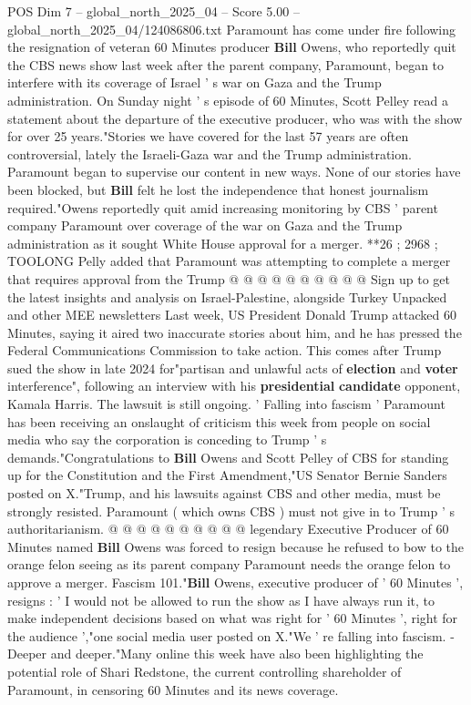 \begin{textsample}{POS Dim 7 – global\_north\_2025\_04 – Score 5.00 – global\_north\_2025\_04/124086806.txt}  \label{ex:f7_pos_365}
Paramount has come under fire following the resignation of veteran 60 Minutes producer \textbf{Bill} Owens, who reportedly quit the CBS news show last week after the parent company, Paramount, began to interfere with its coverage of Israel ' s war on Gaza and the Trump administration.
On Sunday night ' s episode of 60 Minutes, Scott Pelley read a statement about the departure of the executive producer, who was with the show for over 25 years."Stories we have covered for the last 57 years are often controversial, lately the Israeli-Gaza war and the Trump administration.
Paramount began to supervise our content in new ways.
None of our stories have been blocked, but \textbf{Bill} felt he lost the independence that honest journalism required."Owens reportedly quit amid increasing monitoring by CBS ' parent company Paramount over coverage of the war on Gaza and the Trump administration as it sought White House approval for a merger. **26 ; 2968 ; TOOLONG Pelly added that Paramount was attempting to complete a merger that requires approval from the Trump @ @ @ @ @ @ @ @ @ @ Sign up to get the latest insights and analysis on Israel-Palestine, alongside Turkey Unpacked and other MEE newsletters Last week, US President Donald Trump attacked 60 Minutes, saying it aired two inaccurate stories about him, and he has pressed the Federal Communications Commission to take action.
This comes after Trump sued the show in late 2024 for"partisan and unlawful acts of \textbf{election} and \textbf{voter} interference", following an interview with his \textbf{presidential} \textbf{candidate} opponent, Kamala Harris.
The lawsuit is still ongoing. ' Falling into fascism ' Paramount has been receiving an onslaught of criticism this week from people on social media who say the corporation is conceding to Trump ' s demands."Congratulations to \textbf{Bill} Owens and Scott Pelley of CBS for standing up for the Constitution and the First Amendment,"US Senator Bernie Sanders posted on X."Trump, and his lawsuits against CBS and other media, must be strongly resisted.
Paramount ( which owns CBS ) must not give in to Trump ' s authoritarianism. @ @ @ @ @ @ @ @ @ @ legendary Executive Producer of 60 Minutes named \textbf{Bill} Owens was forced to resign because he refused to bow to the orange felon seeing as its parent company Paramount needs the orange felon to approve a merger.
Fascism 101."\textbf{Bill} Owens, executive producer of ' 60 Minutes ', resigns : ' I would not be allowed to run the show as I have always run it, to make independent decisions based on what was right for ' 60 Minutes ', right for the audience ',"one social media user posted on X."We ' re falling into fascism. - Deeper and deeper."Many online this week have also been highlighting the potential role of Shari Redstone, the current controlling shareholder of Paramount, in censoring 60 Minutes and its news coverage.

\end{textsample}
